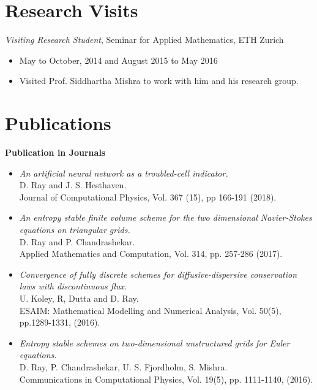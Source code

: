 \documentclass[margin]{res}
\begin{document}
\begin{resume}
\section{Research Visits}
 {\it Visiting Research Student}, Seminar for Applied Mathematics, ETH Zurich
 \begin{itemize} \itemsep -2pt  %
 \item May to October, 2014 and August 2015 to May 2016            
 \item Visited Prof. Siddhartha Mishra to work with him and his research group.
 \end{itemize}

 \section{Publications}

\textbf{Publication in Journals}                
            \begin{itemize}            
   
           \item {\it An artificial neural network as a troubled-cell indicator.}\\
            D. Ray and J. S. Hesthaven.\\
            Journal of Computational Physics, Vol. 367 (15), pp 166-191 (2018).

            \item {\it An entropy stable finite volume scheme for the two dimensional Navier-Stokes equations on triangular grids.}\\
            D. Ray and P. Chandrashekar.\\
             Applied Mathematics and Computation, Vol. 314, pp. 257-286 (2017).

             \item {\it Convergence of fully discrete schemes for diffusive-dispersive conservation laws with discontinuous flux.}\\
              U. Koley, R, Dutta and D. Ray. \\
              ESAIM: Mathematical Modelling and Numerical Analysis, Vol. 50(5), pp.1289-1331, (2016).
              
              \item {\it Entropy stable schemes on two-dimensional unstructured grids for Euler equations.}\\
              D. Ray, P. Chandrashekar, U. S. Fjordholm, S. Mishra. \\
              Communications in Computational Physics, Vol. 19(5), pp. 1111-1140, (2016).
            

\end{itemize}
\end{resume}
\end{document}
